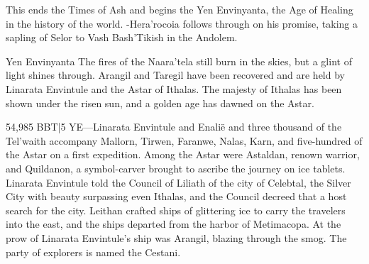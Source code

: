 \documentclass[smalldemyvopaper,11pt,twoside,onecolumn,openright,extrafontsizes]{memoir}
\begin{document}
{{	This ends the Times of Ash and begins the Yen Envinyanta, the Age of Healing in the history of the world.
-Hera’rocoia follows through on his promise, taking a sapling of Selor to Vash Bash’Tikish in the Andolem.

Yen Envinyanta
The fires of the Naara’tela still burn in the skies, but a glint of light shines through. Arangil and Taregil have been recovered and are held by Linarata Envintule and the Astar of Ithalas. The majesty of Ithalas has been shown under the risen sun, and a golden age has dawned on the Astar.

54,985 BBT|5 YE—Linarata Envintule and Enalië and three thousand of the Tel’waith accompany Mallorn, Tirwen, Faranwe, Nalas, Karn, and five-hundred of the Astar on a first expedition. Among the Astar were Astaldan, renown warrior, and Quildanon, a symbol-carver brought to ascribe the journey on ice tablets. Linarata Envintule told the Council of Liliath of the city of Celebtal, the Silver City with beauty surpassing even Ithalas, and the Council decreed that a host search for the city. Leithan crafted ships of glittering ice to carry the travelers into the east, and the ships departed from the harbor of Metimacopa. At the prow of Linarata Envintule’s ship was Arangil, blazing through the smog. The party of explorers is named the Cestani.

}}
\end{document}
